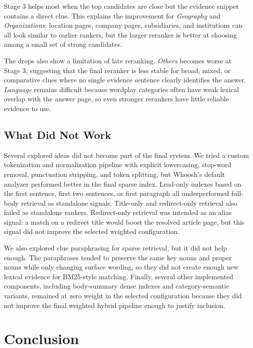 \documentclass[11pt]{article}
\begin{document}
Stage 3 helps most when the top candidates are close but the evidence snippet contains a direct clue. This explains the improvement for \textit{Geography} and \textit{Organizations}: location pages, company pages, subsidiaries, and institutions can all look similar to earlier rankers, but the larger reranker is better at choosing among a small set of strong candidates.

The drops also show a limitation of late reranking. \textit{Others} becomes worse at Stage 3, suggesting that the final reranker is less stable for broad, mixed, or comparative clues where no single evidence sentence clearly identifies the answer. \textit{Language} remains difficult because wordplay categories often have weak lexical overlap with the answer page, so even stronger rerankers have little reliable evidence to use.

\subsection{What Did Not Work}

Several explored ideas did not become part of the final system. We tried a custom tokenization and normalization pipeline with explicit lowercasing, stop-word removal, punctuation stripping, and token splitting, but Whoosh's default analyzer performed better in the final sparse index. Lead-only indexes based on the first sentence, first two sentences, or first paragraph all underperformed full-body retrieval as standalone signals. Title-only and redirect-only retrieval also failed as standalone rankers. Redirect-only retrieval was intended as an alias signal: a match on a redirect title would boost the resolved article page, but this signal did not improve the selected weighted configuration.

We also explored clue paraphrasing for sparse retrieval, but it did not help enough. The paraphrases tended to preserve the same key nouns and proper nouns while only changing surface wording, so they did not create enough new lexical evidence for BM25-style matching. Finally, several other implemented components, including body-summary dense indexes and category-semantic variants, remained at zero weight in the selected configuration because they did not improve the final weighted hybrid pipeline enough to justify inclusion.

\section{Conclusion}
\end{document}
